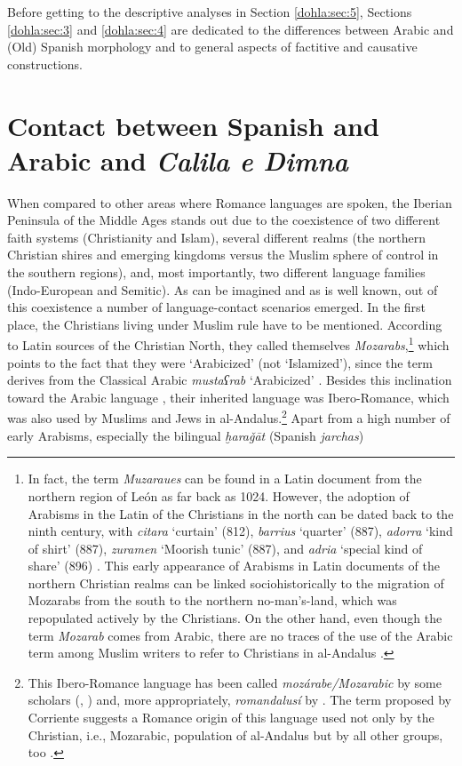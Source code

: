 \documentclass[output=paper]{langscibook}
\begin{document}
Before getting to the descriptive analyses in Section \ref{dohla:sec:5}, Sections \ref{dohla:sec:3} and \ref{dohla:sec:4} are dedicated to the differences between Arabic and (Old) Spanish morphology and to general aspects of factitive and causative constructions.

\section{Contact between Spanish and Arabic and \textit{Calila e Dimna}}\label{dohla:sec:2}

When compared to other areas where Romance languages are spoken, the Iberian Peninsula of the Middle Ages stands out due to the coexistence of two different faith systems (Christianity and Islam), several different realms (the northern Christian shires and emerging kingdoms versus the Muslim sphere of control in the southern regions), and, most importantly, two different language families (Indo-European and Semitic). As can be imagined and as is well known, out of this coexistence a number of language-contact scenarios emerged. In the first place, the Christians living under Muslim rule have to be mentioned. According to Latin sources of the Christian North, they called themselves \textit{Mozarabs},\footnote{In fact, the term \textit{Muzaraues} \citep[497]{perez_lexicon_2010} can be found in a Latin document from the northern region of León as far back as 1024. However, the adoption of Arabisms in the Latin of the Christians in the north can be dated back to the ninth century, with \textit{citara} ‘curtain’ (812), \textit{barrius} ‘quarter’ (887), \textit{adorra} ‘kind of shirt’ (887), \textit{zuramen} ‘Moorish tunic’ (887), and \textit{adria} ‘special kind of share’ (896) \citep[172, 95, 13, 805, 815]{perez_lexicon_2010}. This early appearance of Arabisms in Latin documents of the northern Christian realms can be linked sociohistorically to the migration of Mozarabs from the south to the northern no-man’s-land, which was repopulated actively by the Christians. On the other hand, even though the term \textit{Mozarab} comes from Arabic, there are no traces of the use of the Arabic term among Muslim writers to refer to Christians in al-Andalus \citep[VIII]{simonet_historia_1983}.} which points to the fact that they were ‘Arabicized’ (not ‘Islamized’), since the term derives from the Classical Arabic \textit{mustaʕrab} ‘Arabicized’ \citep[383]{corriente_dictionary_2008-1}. Besides this inclination toward the Arabic language \citep[69]{bossong_maurische_2007}, their inherited language was Ibero-Romance, which was also used by Muslims and Jews in al-Andalus.\footnote{This Ibero-Romance language has been called \textit{mozárabe/Mozarabic} by some scholars (\citealt{beale-rivaya_at_2016,galmes_de_fuentes_dialectologimozarabe_1983}, \citealt[XVII]{hitchcock_mozarabs_2008}) and, more appropriately, \textit{romandalusí} by \citet{corriente_romania_2008}. The term proposed by Corriente suggests a Romance origin of this language used not only by the Christian, i.e., Mozarabic, population of al-Andalus but by all other groups, too \citep[98]{corriente_romania_2008}.} Apart from a high number of early Arabisms, especially the bilingual \textit{ḫaraǧāt} (Spanish \textit{jarchas}) 
\end{document}
